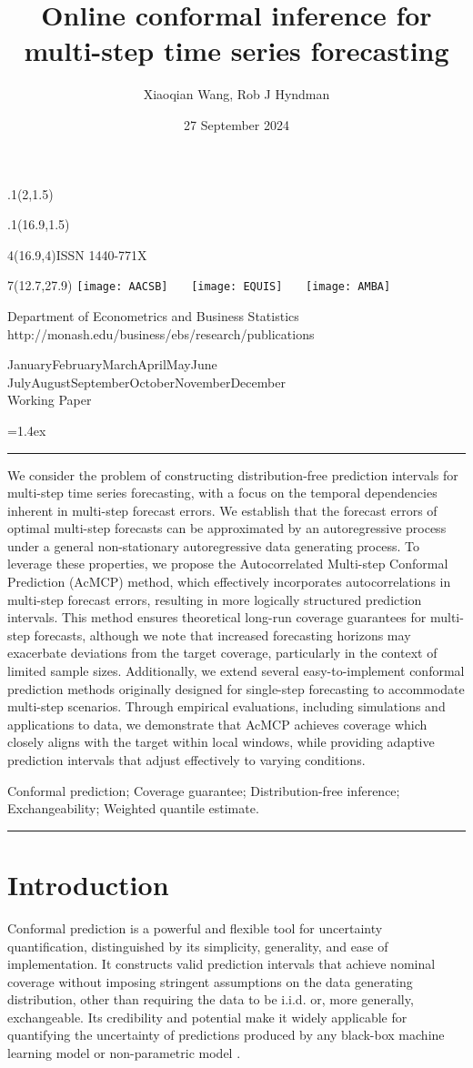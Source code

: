 \documentclass[
  11pt,
  a4paper,
]{article}
\title{Online conformal inference for multi-step time series
forecasting}
\date{27 September 2024}
\author{Xiaoqian Wang, Rob J Hyndman}
\makeatletter
\theoremstyle{plain}
\theoremstyle{remark}
\def\placefig#1#2#3#4{\begin{textblock}{.1}(#1,#2)\rlap{\texttt{[image: \#4]}}\end{textblock}}
\def\Date{\number\day}
\def\Month{\ifcase\month\or
 January\or February\or March\or April\or May\or June\or
 July\or August\or September\or October\or November\or December\fi}
\def\Year{\number\year}
\def\showjel{{\large\textsf{\textbf{JEL classification:}}~\@jel}}
\def\cover{{\sffamily\setcounter{page}{0}
        \thispagestyle{empty}
        \placefig{2}{1.5}{width=5cm}{monash2}
        \placefig{16.9}{1.5}{width=2.1cm}{MBSportrait}
        \begin{textblock}{4}(16.9,4)ISSN 1440-771X\end{textblock}
        \begin{textblock}{7}(12.7,27.9)\hfill
        \texttt{[image: AACSB]}~~~
        \texttt{[image: EQUIS]}~~~
        \texttt{[image: AMBA]}
        \end{textblock}
        \vspace*{2.5cm}
        \begin{center}\Large
        Department of Econometrics and Business Statistics\\[.5cm]
        \footnotesize http://monash.edu/business/ebs/research/publications
        \end{center}\vspace{2cm}
        \begin{center}
        \fbox{\parbox{14cm}{\begin{onehalfspace}\centering\Huge\vspace*{0.3cm}
                \textsf{\textbf{\expandafter{\@title}}}\vspace{1cm}\par
                \LARGE
                \expandafter{\@author}
                \end{onehalfspace}
        }}
        \end{center}
        \vfill
                \begin{center}\Large
                \Month~\Year\\[1cm]
                Working Paper \@wp
        \end{center}\vspace*{2cm}}}
\def\pageone{{\sffamily\setstretch{1}%
        \thispagestyle{empty}%
        \vbox to \textheight{%
        \raggedright\baselineskip=1.2cm
     {\fontsize{24.88}{30}\sffamily\textbf{\expandafter{\@title}}}
        \vspace{2cm}\par
        \hspace{1cm}\parbox{14cm}{\sffamily\large\@addresses}\vspace{1cm}\vfill
        \hspace{1cm}{\large\Date~\Month~\Year}\\[1cm]
        \hspace{1cm}\showjel\vss}}}
\def\blindtitle{{\sffamily
     \thispagestyle{plain}\raggedright\baselineskip=1.2cm
     {\fontsize{24.88}{30}\sffamily\textbf{\expandafter{\@title}}}\vspace{1cm}\par
        }}
\def\titlepage{{\cover\newpage\pageone\newpage\blindtitle}}
\let\maketitle\titlepage
\newenvironment{keywords}{\par\vspace{0.5cm}\noindent{\sffamily\textbf{Keywords:}}}{\vspace{0.25cm}\par\hrule\vspace{0.5cm}\par}
\renewenvironment{abstract}{\begin{minipage}{\textwidth}\parskip=1.4ex\noindent
\hrule\vspace{0.1cm}\par{\sffamily\textbf{\abstractname}}\newline\setstretch{1.1}}
  {\end{minipage}}
\makeatother
\begin{document}
\maketitle

\begin{abstract}
We consider the problem of constructing distribution-free prediction
intervals for multi-step time series forecasting, with a focus on the
temporal dependencies inherent in multi-step forecast errors. We
establish that the forecast errors of optimal multi-step forecasts can
be approximated by an autoregressive process under a general
non-stationary autoregressive data generating process. To leverage these
properties, we propose the Autocorrelated Multi-step Conformal
Prediction (AcMCP) method, which effectively incorporates
autocorrelations in multi-step forecast errors, resulting in more
logically structured prediction intervals. This method ensures
theoretical long-run coverage guarantees for multi-step forecasts,
although we note that increased forecasting horizons may exacerbate
deviations from the target coverage, particularly in the context of
limited sample sizes. Additionally, we extend several easy-to-implement
conformal prediction methods originally designed for single-step
forecasting to accommodate multi-step scenarios. Through empirical
evaluations, including simulations and applications to data, we
demonstrate that AcMCP achieves coverage which closely aligns with the
target within local windows, while providing adaptive prediction
intervals that adjust effectively to varying conditions.
\end{abstract}

\begin{keywords}
  Conformal prediction; Coverage guarantee; Distribution-free
inference; Exchangeability; 
  Weighted quantile estimate.
\end{keywords}


\section{Introduction}\label{sec-intro}

Conformal prediction \autocite{vovk2005} is a powerful and flexible tool
for uncertainty quantification, distinguished by its simplicity,
generality, and ease of implementation. It constructs valid prediction
intervals that achieve nominal coverage without imposing stringent
assumptions on the data generating distribution, other than requiring
the data to be i.i.d. or, more generally, exchangeable. Its credibility
and potential make it widely applicable for quantifying the uncertainty
of predictions produced by any black-box machine learning model
\autocite{shafer2008,papadopoulos2008,barber2021} or non-parametric
model \autocite{lei2014}.
\end{document}
